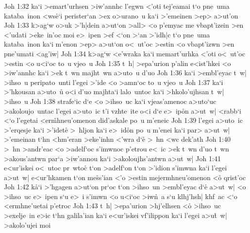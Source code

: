 \vs Joh 1:32
ka`i
>emart'urhsen
>iw'annhc
l'egwn
<'oti
tej'eamai
t`o
pne~uma
kataba~inon
<ws\r{e}`i
perister`an
>ex
o>urano~u
ka`i
>'emeinen
>ep>
a>ut'on\bibvsend
\vs Joh 1:33
k>ag`w
o>uk
>'h|dein
a>ut`on
>all>
<o
p'emyac
me
vbapt'izein
>en
<'udati
>eke~in'oc
moi
e>~ipen
>ef
<`on
>`an
>'idh|c
t`o
pne~uma
kataba~inon
ka`i
m'enon
>ep>
a>ut`on
o<~ut'oc
>estin
<o
vbapt'izwn
>en
pne'umati
<ag'iw|\bibvsend
\vs Joh 1:34
k>ag`w
<e'wraka
ka`i
memart'urhka
<'oti
o<~ut'oc
>estin
<o
u<i`oc
to~u
vjeo~u\bibvsend
\vs Joh 1:35
t~h|
>epa'urion
p'alin
e<ist'hkei
<o
>iw'annhc
ka`i
>ek
t~wn
majht~wn
a>uto~u
d'uo\bibvsend
\vs Joh 1:36
ka`i
>embl'eyac
t~w|
>ihso~u
peripato~unti
l'egei
>'ide
<o
>amn`oc
to~u
vjeo~u\bibvsend
\vs Joh 1:37
ka`i
>'hkousan
a>uto~u\r{}
o<i
d'uo
majhta`i
lalo~untoc
ka`i
>hkolo'ujhsan
t~w|
>ihso~u\bibvsend
\vs Joh 1:38
strafe`ic
d`e
<o
>ihso~uc
ka`i
vjeas'amenoc
a>uto`uc
>akoloujo~untac
l'egei
a>uto~ic
t'i
vzhte~ite
o<i
d`e
e>~ip\r{o}n
a>ut~w|
<rabb`i
<`o
l'egetai
<er\r{m}hneu'omenon
did'askale
po~u
m'eneic\bibvsend
\vs Joh 1:39
l'egei
a>uto~ic
>'erqesje
ka`i
>'idete\r{}
>~hljon
ka`i
e>~id\r{o}n
po~u
m'enei
ka`i
par>
a>ut~w|
>'emeinan
t`hn
<hm'eran
>eke'inhn
<'wra
d`e\r{}
>~hn
<wc
dek'ath\bibvsend
\vs Joh 1:40
>~hn
>andr'eac
<o
>adelf`oc
s'imwnoc
p'etrou
e<~ic
>ek
t~wn
d'uo
t~wn
>akous'antwn
par`a
>iw'annou
ka`i
>akoloujhs'antwn
a>ut~w|\bibvsend
\vs Joh 1:41
e<ur'iskei
o<~utoc
pr~wto\r{c}
t`on
>adelf`on
t`on
>'idion
s'imwna
ka`i
l'egei
a>ut~w|
e<ur'hkamen
t`on
me\r{s}s'ian
<'o
>estin
mejermhneu'omenon
<o\r{}
qrist'oc\bibvsend
\vs Joh 1:42
k\r{a}`i
>'hgagen
a>ut`on
pr`oc
t`on
>ihso~un
>embl'eyac
d`e\r{}
a>ut~w|
<o
>ihso~uc
e>~ipen
s`u
e>~i
s'imwn
<o
u<i`oc
>iw\r{n}~a
s`u
klhj'hsh|
khf~ac
<`o
<ermhne'uetai
p'etroc\bibvsend
\vs Joh 1:43
t~h|
>epa'urion
>hj'elhsen
<o\r{}
>ihso~uc
>exelje~in
e>ic
t`hn
galila'ian
ka`i
e<ur'iskei
vf'ilippon
ka`i
l'egei
a>u\r{t}~w|
>akolo'ujei
moi\bibvsend
